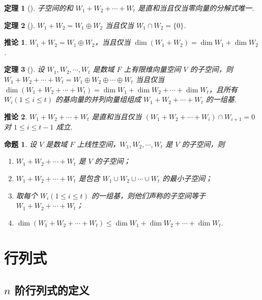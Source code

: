 \documentclass[zihao=-4,UTF8,linespread=1.8,nothm]{aytony_base}
\newtheorem{theorem}{\indent 定理}[subsection]
\newtheorem{proposition}{\indent 命题}[subsection]
\newtheorem*{corollary}{\indent 推论}
\begin{document}
\begin{theorem}[]
    子空间的和 $W_1 + W_2 + \cdots + W_t$ 是直和当且仅当零向量的分解式唯一.
\end{theorem}

\begin{theorem}[]
    $W_1 + W_2 = W_1 \oplus W_2$ 当且仅当 $W_1 \cap W_2 = \{0\}$.
\end{theorem}

\begin{corollary}
    $W_1 + W_2 = W_1 \oplus W_2$，当且仅当 $\dim(W_1 + W_2) = \dim W_1 + \dim W_2$.
\end{corollary}

\begin{theorem}[]
    设 $W_1, W_2, \cdots, W_t$ 是数域 $F$ 上有限维向量空间 $V$ 的子空间，则 $W_1 + W_2 + \cdots + W_t = W_1 \oplus W_2 \oplus \cdots \oplus W_t$ 当且仅当 $\dim(W_1 + W_2 + \cdots + W_t) = \dim W_1 +\dim W_2 + \cdots + \dim W_t$，且所有 $W_i(1 \leqslant i \leqslant t)$ 的基向量的并列向量组组成 $W_1 + W_2 + \cdots + W_t$ 的一组基.
\end{theorem}

\begin{corollary}
    $W_1 + W_2 + \cdots + W_t$ 是直和当且仅当 $(W_1 + W_2 + \cdots + W_i) \cap W_{i+1} = 0$ 对 $1 \leqslant i \leqslant t-1$ 成立.
\end{corollary}

\begin{proposition}
    设 $V$ 是数域 $F$ 上线性空间，$W_1, W_2, \cdots, W_t$ 是 $V$ 的子空间，则
    \begin{enumerate}[nosep]
        \item $W_1+W_2+\cdots+W_t$ 是 $V$ 的子空间；
        \item $W_1+W_2+\cdots+W_t$ 是包含 $W_1\cup W_2 \cup \cdots \cup W_t$ 的最小子空间；
        \item 取每个 $W_i(1 \leqslant i \leqslant t)$ 的一组基，则他们声称的子空间等于 $W_1 + W_2 + \cdots + W_t$；
        \item $\dim(W_1 + W_2 + \cdots + W_t)\leqslant \dim W_1 + \dim W_2 + \cdots + \dim W_t$.
    \end{enumerate}
\end{proposition}

\section{行列式}

\subsection{\texorpdfstring{$n$}{} 阶行列式的定义}
\end{document}
